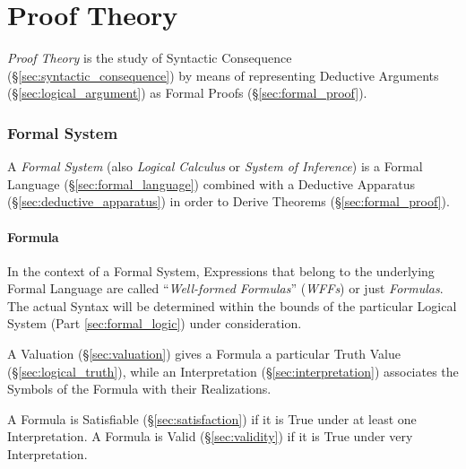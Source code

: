 \part{Proof Theory}\label{sec:proof_theory}

\emph{Proof Theory} is the study of Syntactic Consequence
(\S\ref{sec:syntactic_consequence}) by means of representing Deductive
Arguments (\S\ref{sec:logical_argument}) as Formal Proofs
(\S\ref{sec:formal_proof}).



\section{Formal System}\label{sec:formal_system}

A \emph{Formal System} (also \emph{Logical Calculus} or \emph{System
  of Inference}) is a Formal Language (\S\ref{sec:formal_language})
combined with a Deductive Apparatus (\S\ref{sec:deductive_apparatus})
in order to Derive Theorems (\S\ref{sec:formal_proof}).



\subsection{Formula}\label{sec:formula}

In the context of a Formal System, Expressions that belong to the
underlying Formal Language are called ``\emph{Well-formed Formulas}''
(\emph{WFFs}) or just \emph{Formulas}. The actual Syntax will be
determined within the bounds of the particular Logical System (Part
\ref{sec:formal_logic}) under consideration.

A Valuation (\S\ref{sec:valuation}) gives a Formula a particular Truth
Value (\S\ref{sec:logical_truth}), while an Interpretation
(\S\ref{sec:interpretation}) associates the Symbols of the Formula
with their Realizations.

A Formula is Satisfiable (\S\ref{sec:satisfaction}) if it is True
under at least one Interpretation. A Formula is Valid
(\S\ref{sec:validity}) if it is True under very Interpretation.




